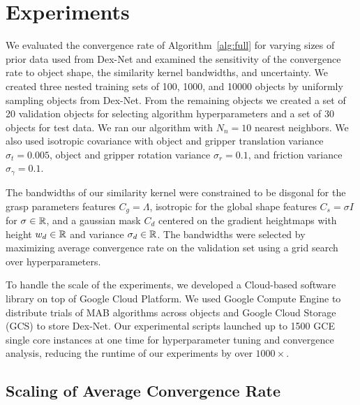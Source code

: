 \section{Experiments}

We evaluated the convergence rate of Algorithm~\ref{alg:full} for varying sizes of prior data used from Dex-Net and examined the sensitivity of the convergence rate to object shape, the similarity kernel bandwidths, and uncertainty.
We created three nested training sets of 100, 1000, and 10000 objects by uniformly sampling objects from Dex-Net.
From the remaining objects we created a set of 20 validation objects for selecting algorithm hyperparameters and a set of 30 objects for test data.
We ran our algorithm with $N_n = 10$ nearest neighbors.
We also used isotropic covariance with object and gripper translation variance $\sigma_{t} = 0.005$, object and gripper rotation variance $\sigma_{r} = 0.1$, and friction variance $\sigma_{\gamma} = 0.1$.

The bandwidths of our similarity kernel were constrained to be disgonal for the grasp parameters features $C_g = \Lambda$, isotropic for the global shape features $C_s = \sigma I$ for $\sigma \in \mathbb{R}$, and a gaussian mask $C_d$ centered on the gradient heightmaps with height $w_d \in \mathbb{R}$ and variance $\sigma_d \in \mathbb{R}$.
The bandwidths were selected by maximizing average convergence rate on the validation set using a grid search over hyperparameters.

To handle the scale of the experiments, we developed a Cloud-based software library on top of Google Cloud Platform.
We used Google Compute Engine to distribute trials of MAB algorithms across objects and Google Cloud Storage (GCS) to store Dex-Net.
Our experimental scripts launched up to 1500 GCE single core instances at one time for hyperparameter tuning and convergence analysis, reducing the runtime of our experiments by over $1000\times$.

\subsection{Scaling of Average Convergence Rate}

